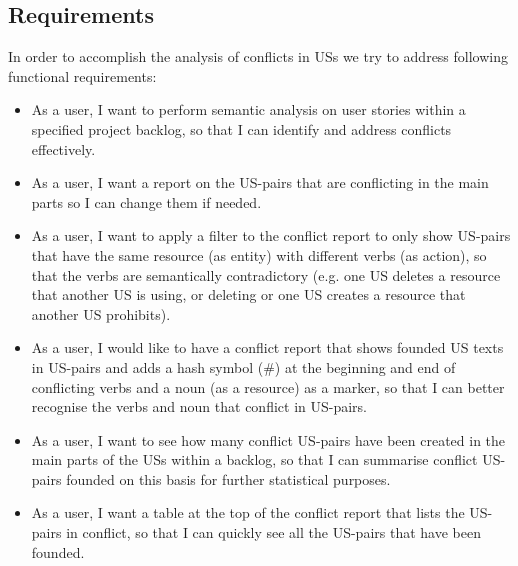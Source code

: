 \subsection{Requirements}\label{conflict_requirement}
In order to accomplish the analysis of conflicts in USs we try to address following functional requirements:
\begin{itemize}
	
	\item As a user, I want to perform semantic analysis on user stories within a specified project backlog, so that I can identify and address conflicts effectively.
	
	\item As a user, I want a report on the US-pairs that are conflicting in the main parts so I can change them if needed.
	
	\item As a user, I want to apply a filter to the conflict report to only show US-pairs that have the same resource (as entity) with different verbs (as action), so that the verbs are semantically contradictory (e.g. one US deletes a resource that another US is using, or deleting or one US creates a resource that another US prohibits).
	
	
	
	\item As a user, I would like to have a conflict report that shows founded US texts in US-pairs and adds a hash symbol (\#) at the beginning and end of conflicting verbs and a noun (as a resource) as a marker, so that I can better recognise the verbs and noun that conflict in US-pairs.
	
	\item As a user, I want to see how many conflict US-pairs have been created in the main parts of the USs within a backlog, so that I can summarise conflict US-pairs founded on this basis for further statistical purposes.
	
	\item As a user, I want a table at the top of the conflict report that lists the US-pairs in conflict, so that I can quickly see all the US-pairs that have been founded.
	
\end{itemize}
